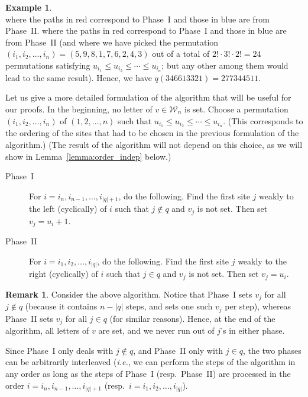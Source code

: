 \documentclass[reqno]{amsart}
\newcommand{\0}{\phantom{c}}
\newcommand{\mcW}{\mathcal{W}}
\newenvironment{verlong}{}{}
\newenvironment{vershort}{}{}
\newcommand{\abs}[1]{\left| #1 \right|}
\newcommand{\tup}[1]{\left( #1 \right)}
\theoremstyle{plain}
\theoremstyle{definition}
\newtheorem{example}[thm]{Example}
\newtheorem{remark}[thm]{Remark}
\numberwithin{equation}{section}
\begin{document}
\begin{example}
\[\]
\begin{vershort}
where the paths in red correspond to Phase~I and those in blue are from Phase~II.
\end{vershort}
\begin{verlong}
where the paths in red correspond to Phase~I and those in blue are from Phase~II
(and where we have picked the permutation $\tup{i_1, i_2, \ldots, i_n}
= \tup{5, 9, 8, 1, 7, 6, 2, 4, 3}$ out of a total of $2! \cdot 3! \cdot 2! = 24$ permutations
satisfying $u_{i_1} \leq u_{i_2} \leq \cdots \leq u_{i_n}$;
but any other among them would lead to the same result).
\end{verlong}
Hence, we have $q(346613321) = 277344511$.
\end{example}

Let us give a more detailed formulation of the algorithm that will be useful for our proofs.
In the beginning, no letter of $v \in \mcW_n$ is set.
Choose a permutation $\tup{i_1, i_2, \ldots, i_n}$ of $\tup{1, 2, \ldots, n}$ such that $u_{i_1} \leq u_{i_2} \leq \cdots \leq u_{i_n}$.
(This corresponds to the ordering of the sites that had to be chosen in the previous formulation of the algorithm.)
\begin{verlong}
(The result of the algorithm will not depend on this choice, as we will show in Lemma~\ref{lemma:order_indep} below.)
\end{verlong}

\begin{description}
\item[Phase~I]
  For $i = i_n, i_{n-1}, \ldots, i_{\abs{q}+1}$, do the following.
    Find the first site $j$ weakly to the left (cyclically) of $i$ such that $j \notin q$ and $v_j$ is not set.
    Then set $v_j = u_i + 1$.

\item[Phase~II]
  For $i = i_1, i_2, \ldots, i_{\abs{q}}$, do the following.
    Find the first site $j$ weakly to the right (cyclically) of $i$ such that $j \in q$ and $v_j$ is not set.
    Then set $v_j = u_i$.
\end{description}

\begin{remark}
\label{rmk:order-agnostic}
Consider the above algorithm.
Notice that Phase~I sets $v_j$ for all $j \notin q$ (because it contains
$n - \abs{q}$ steps, and sets one such $v_j$ per step),
whereas Phase~II sets $v_j$ for all $j \in q$ (for similar reasons).
Hence, at the end of the algorithm, all letters of $v$ are set, and we never
run out of $j$'s in either phase.

Since Phase~I only deals with $j \notin q$, and Phase~II only with $j\in q$,
the two phases can be arbitrarily interleaved
(\textit{i.e.}, we can perform the steps of the algorithm in any order as long as
the steps of Phase~I (resp.\ Phase~II) are processed in the order $i = i_n, i_{n-1}, \ldots, i_{\abs{q}+1}$
(resp.\ $i = i_1, i_2, \ldots, i_{\abs{q}}$).
\end{remark}
\end{document}
